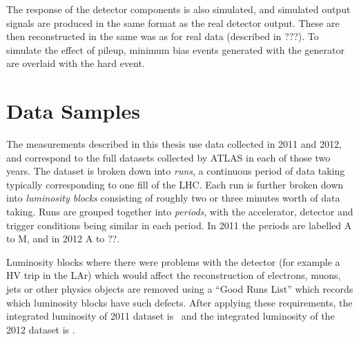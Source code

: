 The response of the detector components is also
simulated, and simulated output signals are produced in the same format as the
real
detector output. These are then reconstructed in the same was as
for real data (described in ???). To simulate the effect of pileup, minimum bias events generated with the \pythia
generator are overlaid with the hard event.

\section{Data Samples}

The measurements described in this thesis use data collected in 2011 and 2012,
and correspond to the full datasets collected by ATLAS in each of those two
years. The dataset is broken down into {\it runs}, a continuous period of data
taking typically corresponding to one fill of the LHC. Each run is further
broken down into {\it luminosity blocks} consisting of roughly two or three
minutes worth of data taking. Runs are grouped together into {\it periods}, with
the accelerator, detector and trigger conditions being similar in each period.
In 2011 the periods are labelled A to M, and in 2012 A to ??.

Luminosity blocks where there were problems with the detector (for example a HV
trip in the LAr) which would affect the reconstruction of electrons, muons, jets
or other physics objects are removed using a ``Good Runs List'' which records
which luminosity blocks have such defects. After applying these requirements,
the integrated luminosity of 2011 dataset is \LumiPassGRLTwentyEleven\ and the integrated luminosity
of the 2012 dataset is \LumiPassGRLTwentyEleven.

